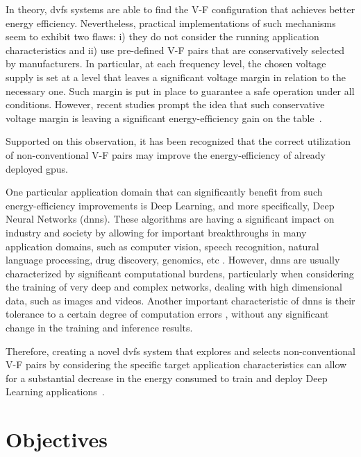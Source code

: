 In theory, \acrshort{dvfs} systems are able to find the V-F configuration that achieves better energy efficiency. Nevertheless, practical implementations of such mechanisms seem to exhibit two flaws: i) they do not consider the running application characteristics and ii) use pre-defined V-F pairs that are conservatively selected by manufacturers. In particular, at each frequency level, the chosen voltage supply is set at a level that leaves a significant voltage margin in relation to the necessary one. Such margin is put in place to guarantee a safe operation under all conditions. However, recent studies prompt the idea that such conservative voltage margin is leaving a significant energy-efficiency gain on the table~\cite{leng_safe_2015}. 

Supported on this observation, it has been recognized that the correct utilization of non-conventional V-F pairs may improve the energy-efficiency of already deployed \acrshort{gpu}s.

One particular application domain that can significantly benefit from such energy-efficiency improvements is Deep Learning, and more specifically, Deep Neural Networks (\acrshort{dnn}s). These algorithms are having a significant impact on industry and society by allowing for important breakthroughs in many application domains, such as computer vision, speech recognition, natural language processing, drug discovery, genomics, etc \cite{shrestha_review_2019}. However, \acrshort{dnn}s are usually characterized by significant computational burdens, particularly when considering the training of very deep and complex networks, dealing with high dimensional data, such as images and videos. Another important characteristic of \acrshort{dnn}s is their tolerance to a certain degree of computation errors \cite{zhang_approxann_2015}, without any significant change in the training and inference results. 

Therefore, creating a novel \acrshort{dvfs} system that explores and selects non-conventional V-F pairs by considering the specific target application characteristics can allow for a substantial decrease in the energy consumed to train and deploy Deep Learning applications~\cite{tang_impact_2019}.






\section{Objectives}
\label{section:objectives}

